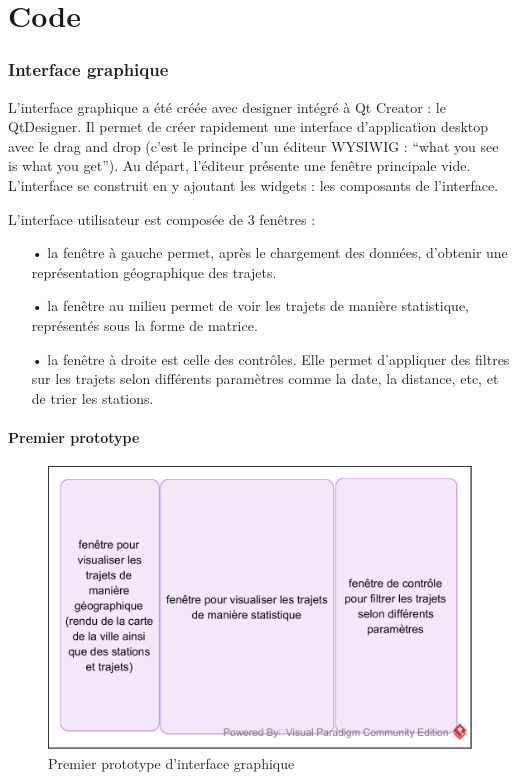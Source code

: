 \documentclass[12pt]{article}
\begin{document}
\clearpage
\newpage
\part{Code}
	\section{Interface graphique}
	L’interface graphique a été créée avec designer intégré à Qt Creator : le QtDesigner. Il permet de créer rapidement une interface d’application desktop avec le drag and drop (c’est le principe d’un éditeur WYSIWIG : “what you see is what you get”). Au départ, l’éditeur présente une fenêtre principale vide. L’interface se construit en y ajoutant les widgets : les composants de l’interface.

	L’interface utilisateur est composée de 3 fenêtres :\\
	\begin{itemize}
	\item[•] la fenêtre à gauche permet, après le chargement des données, d’obtenir une représentation géographique des trajets.
	\item[•] la fenêtre au milieu permet de voir les trajets de manière statistique, représentés sous la forme de matrice.
	\item[•] la fenêtre à droite est celle des contrôles. Elle permet d’appliquer des filtres sur les trajets selon différents paramètres comme la date, la distance, etc, et de trier les stations.
	\end{itemize}
	
		\subsection{Premier prototype}
		\begin{figure}[!h]
		\begin{center}
		\includegraphics[scale=1]{dia_proto-interface_1.png}
		\caption{Premier prototype d’interface graphique}
		\end{center}
		\end{figure}
		
\end{document}
